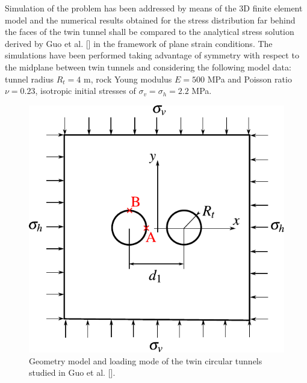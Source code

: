 \documentclass[a4paper,fleqn]{cas-sc}
\begin{document}
Simulation of the problem has been addressed by means of the 3D finite element model and the numerical results obtained for the stress distribution far behind the faces of the twin tunnel shall be compared to the analytical stress solution derived by Guo et al. [] in the framework of plane strain conditions. The simulations have been performed taking advantage of symmetry with respect to the midplane between twin tunnels and considering the following model data: tunnel radius $R_t = 4$ m, rock Young modulus $E = 500$ MPa and Poisson ratio $\nu = 0.23$, isotropic initial stresses of $\sigma_v = \sigma_h = 2.2$ MPa.
\begin{figure}[h!]
	\centering
	\includegraphics[scale=0.7]{GUO_FIG0.pdf}
	\caption{Geometry model and loading mode of the twin circular tunnels studied in Guo et al. [].}
	\label{GUO_FIG0}
\end{figure}
\FloatBarrier
\end{document}
